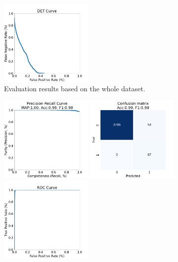 \documentclass[DM,authoryear,toc]{lsstdoc}
\begin{document}
\begin{figure}[h]
  \includegraphics[width=0.4\textwidth]{det_13-resnet50-FullAugmentation-scratch-B64__0255000__npy_data_0.1.2-0sigma_256by256__posw_20.png}
  \caption{Evaluation results based on the whole dataset.}
  \label{fig:tract_templates}
\end{figure}

\begin{figure}[h]
  \centering
  \includegraphics[width=0.4\textwidth]{precrec_13-resnet50-FullAugmentation-scratch-B64__0255000__npy_data_0.1.2-5sigma_256by256__posw_20.png}
  \includegraphics[width=0.4\textwidth]{confmat_13-resnet50-FullAugmentation-scratch-B64__0255000__npy_data_0.1.2-5sigma_256by256__posw_20.png}
  \includegraphics[width=0.4\textwidth]{roc_13-resnet50-FullAugmentation-scratch-B64__0255000__npy_data_0.1.2-5sigma_256by256__posw_20.png}

\end{figure}
\end{document}
